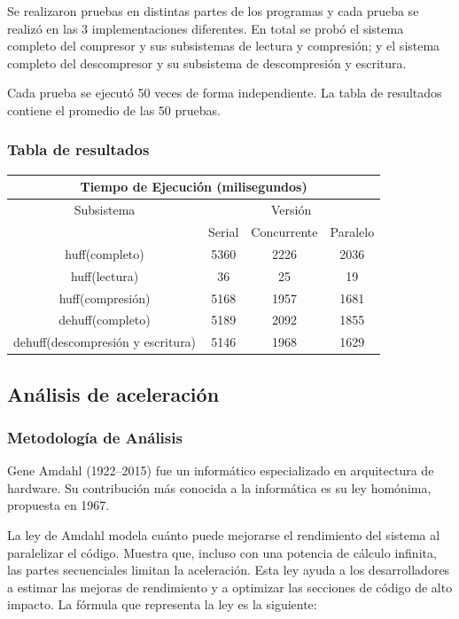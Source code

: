 \documentclass{report}
\begin{document}
Se realizaron pruebas en distintas partes de los programas y cada prueba se realizó en las 3 implementaciones diferentes. En total se probó el sistema completo del compresor y sus subsistemas de lectura y compresión; y el sistema completo del descompresor y su subsistema de descompresión y escritura.

Cada prueba se ejecutó 50 veces de forma independiente. La tabla de resultados contiene el promedio de las 50 pruebas.

\subsubsection{Tabla de resultados}

\begin{center}
	\begin{tabular}{|c|c|c|c|}		
		
\hline
\multicolumn{4}{|c|}{Tiempo de Ejecución (milisegundos)} \\
\hline
 Subsistema& \multicolumn{3}{|c|}{Versión} \\
 \hline
 & Serial & Concurrente & Paralelo\\
 \hline
huff(completo) & 5360& 2226 & 2036\\
 \hline
huff(lectura) &  36 & 25 & 19\\
 \hline
 huff(compresión) &  5168 & 1957 & 1681\\
 \hline
 dehuff(completo) & 5189 & 2092 & 1855\\
 \hline
 dehuff(descompresión y escritura) & 5146 & 1968 & 1629\\
 \hline
 
	\end{tabular}
\end{center}

\subsection{Análisis de aceleración}

\subsubsection{Metodología de Análisis}

Gene Amdahl (1922–2015) fue un informático especializado en arquitectura de hardware. Su contribución más conocida a la informática es su ley homónima, propuesta en 1967. 

La ley de Amdahl modela cuánto puede mejorarse el rendimiento del sistema al paralelizar el código. Muestra que, incluso con una potencia de cálculo infinita, las partes secuenciales limitan la aceleración. Esta ley ayuda a los desarrolladores a estimar las mejoras de rendimiento y a optimizar las secciones de código de alto impacto. La fórmula que representa la ley es la siguiente:
\end{document}
